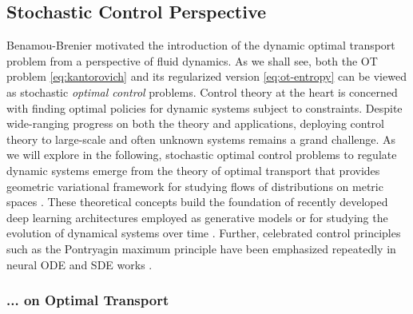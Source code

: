 \subsection{Stochastic Control Perspective} \label{sec:background_control}

Benamou-Brenier motivated the introduction of the dynamic optimal transport problem from a perspective of fluid dynamics.
As we shall see, both the OT problem \eqref{eq:kantorovich} and its regularized version \eqref{eq:ot-entropy} can be viewed as stochastic \textit{optimal control} problems.
Control theory at the heart is concerned with finding optimal policies for dynamic systems subject to constraints. Despite wide-ranging progress on both the theory and applications, deploying control theory to large-scale and often unknown systems remains a grand challenge.
As we will explore in the following, stochastic optimal control problems to regulate dynamic systems emerge from the theory of optimal transport \citep{santambrogio2015optimal} that provides geometric variational framework for studying flows of distributions on metric spaces \citep{chen2021optimal}.
These theoretical concepts build the foundation of recently developed deep learning architectures employed as generative models \citep{song2020score, de2021diffusion} or for studying the evolution of dynamical systems over time \citep{chen2021likelihood, bunne2022proximal, vargas2021solving}.
Further, celebrated control principles such as the Pontryagin maximum principle have been emphasized repeatedly in neural \acrfull{ODE} \citep{chen2018neural} and \acrfull{SDE} works \citep{jia2019neural}.

\subsubsection*{... on Optimal Transport} \label{sec:background_control_ot}

